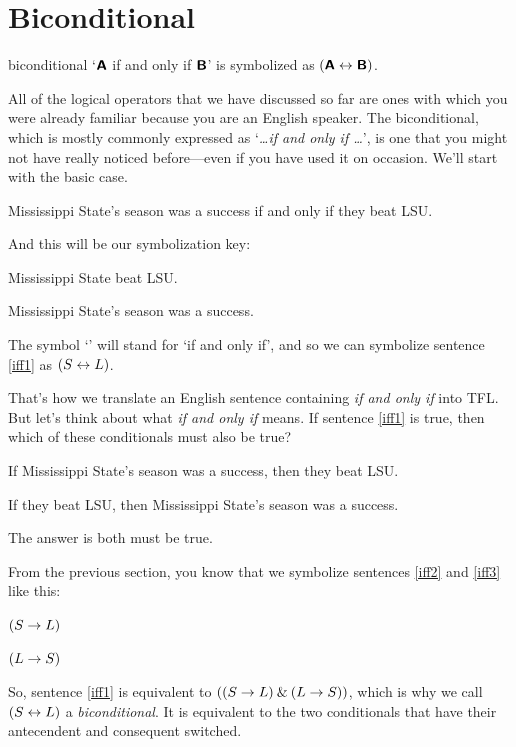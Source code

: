 \section{Biconditional}\label{s:biconditional-1}

\begin{factboxy}{biconditional}
`$\bm{\mathsf{A}}$ if and only if $\bm{\mathsf{B}}$' is symbolized as $(\bm{\mathsf{A}} \leftrightarrow \bm{\mathsf{B}})$.
\end{factboxy}


All of the logical operators that we have discussed so far are ones with which you were already familiar because you are an English speaker. The biconditional, which is mostly commonly expressed as `\textit{\ldots if and only if \ldots}', is one that you might not have really noticed before---even if you have used it on occasion. We'll start with the basic case.
	\begin{earg}
		\item[\ex{iff1}] Mississippi State's season was a success if and only if they beat LSU.
	\end{earg}
And this will be our symbolization key:
	\begin{ekey}
		\item[L] Mississippi State beat LSU.
		\item[S] Mississippi State's season was a success.
	\end{ekey}
The symbol `\eiff' will stand for `if and only if', and so we can symbolize sentence \ref{iff1} as $(S \leftrightarrow L)$.

That's how we translate an English sentence containing \textit{if and only if} into TFL. But let's think about what \textit{if and only if} means. If sentence \ref{iff1} is true, then which of these conditionals must also be true?
	\begin{earg}
		\item[\ex{iff2}] If Mississippi State's season was a success, then they beat LSU.
		\item[\ex{iff3}] If they beat LSU, then Mississippi State's season was a success.
	\end{earg}
The answer is both must be true.
	
From the previous section, you know that we symbolize sentences \ref{iff2} and \ref{iff3} like this:
	\begin{earg}
		\item[\ref{iff2}.] $(S \rightarrow L)$
		\item[\ref{iff3}.] $(L \rightarrow S)$ 
	\end{earg}
So, sentence \ref{iff1} is equivalent to $((S \rightarrow L) \mathbin{\&} (L \rightarrow S))$, which is why we call $(S \leftrightarrow L)$ a \textit{biconditional}. It is equivalent to the two conditionals that have their antecendent and consequent switched.

